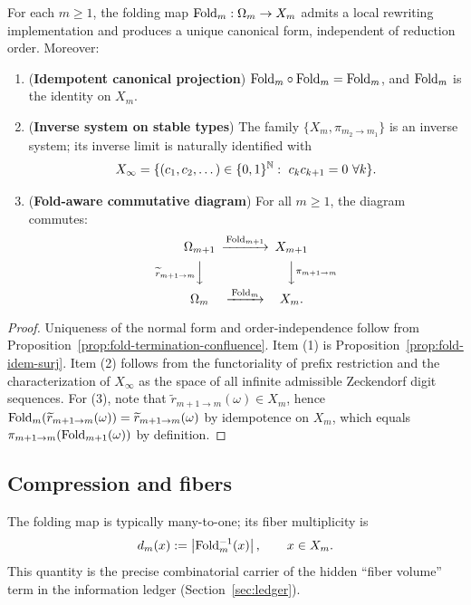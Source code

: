 \begin{theorem}\label{thm:fold-normal-form-multiscale}
For each $m\ge 1$, the folding map $\mathrm{Fold}_m:\Omega_m\to X_m$ admits a local rewriting implementation and produces a unique canonical form, independent of reduction order.
Moreover:
\begin{enumerate}
  \item (\textbf{Idempotent canonical projection}) $\mathrm{Fold}_m\circ\mathrm{Fold}_m=\mathrm{Fold}_m$, and $\mathrm{Fold}_m$ is the identity on $X_m$.
  \item (\textbf{Inverse system on stable types}) The family $\{X_m,\pi_{m_2\to m_1}\}$ is an inverse system; its inverse limit is naturally identified with
  \[
  X_\infty=\{(c_1,c_2,\dots)\in\{0,1\}^{\NN}:\ c_kc_{k+1}=0\ \forall k\}.
  \]
  \item (\textbf{Fold-aware commutative diagram}) For all $m\ge 1$, the diagram commutes:
  \[
  \begin{CD}
  \Omega_{m+1} @>{\Fold_{m+1}}>> X_{m+1}\\
  @V{\widetilde r_{m+1\to m}}VV @VV{\pi_{m+1\to m}}V\\
  \Omega_m @>{\Fold_m}>> X_m.
  \end{CD}
  \]
\end{enumerate}
\end{theorem}

\begin{proof}
Uniqueness of the normal form and order-independence follow from Proposition~\ref{prop:fold-termination-confluence}.
Item (1) is Proposition~\ref{prop:fold-idem-surj}.
Item (2) follows from the functoriality of prefix restriction and the characterization of $X_\infty$ as the space of all infinite admissible Zeckendorf digit sequences.
For (3), note that $\widetilde r_{m+1\to m}(\omega)\in X_m$, hence $\mathrm{Fold}_m(\widetilde r_{m+1\to m}(\omega))=\widetilde r_{m+1\to m}(\omega)$ by idempotence on $X_m$, which equals $\pi_{m+1\to m}(\mathrm{Fold}_{m+1}(\omega))$ by definition.
\end{proof}

\subsection{Compression and fibers}\label{subsec:fold-fibers}
The folding map is typically many-to-one; its fiber multiplicity is
\[
d_m(x):=\left\lvert \mathrm{Fold}_m^{-1}(x)\right\rvert,\qquad x\in X_m.
\]
This quantity is the precise combinatorial carrier of the hidden ``fiber volume'' term in the information ledger (Section~\ref{sec:ledger}).

